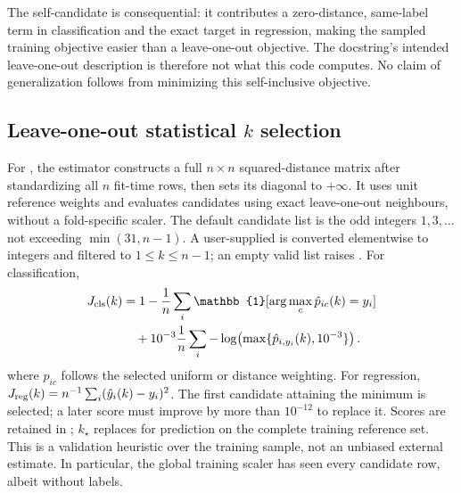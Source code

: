 \documentclass[conference]{IEEEtran}
\begin{document}
The self-candidate is consequential: it contributes a zero-distance, same-label term in classification and the exact target in regression, making the sampled training objective easier than a leave-one-out objective. The docstring's intended leave-one-out description is therefore not what this code computes. No claim of generalization follows from minimizing this self-inclusive objective.

\subsection{Leave-one-out statistical $k$ selection}
\label{sec:selection}
For , the estimator constructs a full $n\times n$ squared-distance matrix after standardizing all $n$ fit-time rows, then sets its diagonal to $+\infty$. It uses unit reference weights and evaluates candidates using exact leave-one-out neighbours, without a fold-specific scaler. The default candidate list is the odd integers $1,3,\ldots$ not exceeding $\min(31,n-1)$. A user-supplied  is converted elementwise to integers and filtered to $1\leq k\leq n-1$; an empty valid list raises . For classification,
\begin{align}
 J_{\rm cls}(k)&=1-\frac1n\sum_i\mathbb{1}[\arg\max_c\hat p_{ic}(k)=y_i]\\
 &\quad+10^{-3}\frac1n\sum_i-\log\!\left(\max\{\hat p_{i,y_i}(k),10^{-3}\}\right).
 \label{eq:kcls}
\end{align}
where $\hat p_{ic}$ follows the selected uniform or distance weighting. For regression, $J_{\rm reg}(k)=n^{-1}\sum_i(\hat y_i(k)-y_i)^2$. The first candidate attaining the minimum is selected; a later score must improve by more than $10^{-12}$ to replace it. Scores are retained in ; $k_\star$ replaces  for prediction on the complete training reference set. This is a validation heuristic over the training sample, not an unbiased external estimate. In particular, the global training scaler has seen every candidate row, albeit without labels.
\end{document}
